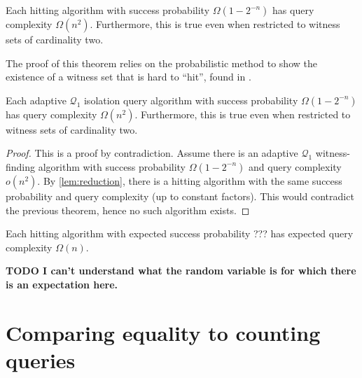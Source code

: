 \documentclass{article}
\newcommand{\todo}[1]{\textbf{TODO #1}}
\newcommand{\mc}{\mathcal}
\begin{document}
\begin{theorem}
  Each hitting algorithm with success probability $\Omega(1 - 2^{-n})$ has query complexity $\Omega(n^2)$.
  Furthermore, this is true even when restricted to witness sets of cardinality two.
\end{theorem}

The proof of this theorem relies on the probabilistic method to show the existence of a witness set that is hard to ``hit'', found in \autocite{ablp91}.

\begin{corollary}\label{cor:isolationalg}
  Each adaptive $\mc{Q}_1$ isolation query algorithm with success probability $\Omega(1 - 2^{-n})$ has query complexity $\Omega(n^2)$.
  Furthermore, this is true even when restricted to witness sets of cardinality two.
\end{corollary}
\begin{proof}
  This is a proof by contradiction.
  Assume there is an adaptive $\mc{Q}_1$ witness-finding algorithm with success probability $\Omega(1 - 2^{-n})$ and query complexity $o(n^2)$.
  By \autoref{lem:reduction}, there is a hitting algorithm with the same success probability and query complexity (up to constant factors).
  This would contradict the previous theorem, hence no such algorithm exists.
\end{proof}


\begin{theorem}
  Each hitting algorithm with expected success probability ??? has expected query complexity $\Omega(n)$.
\end{theorem}

\todo{I can't understand what the random variable is for which there is an expectation here.}

\section{Comparing equality to counting queries}
\end{document}
